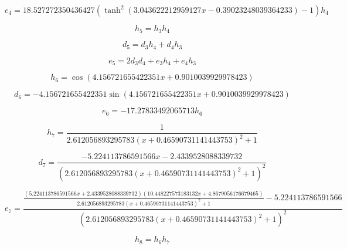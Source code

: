 \begin{equation}
e_{4}=18.527272350436427 \left(\tanh^{2}{\left(3.043622212959127 x - 0.39023248039364233 \right)} - 1\right) h_{4}
\end{equation}


\begin{equation}
h_{5}=h_{3} h_{4}
\end{equation}


\begin{equation}
d_{5}=d_{3} h_{4} + d_{4} h_{3}
\end{equation}


\begin{equation}
e_{5}=2 d_{3} d_{4} + e_{3} h_{4} + e_{4} h_{3}
\end{equation}


\begin{equation}
h_{6}=\cos{\left(4.156721655422351 x + 0.9010039929978423 \right)}
\end{equation}


\begin{equation}
d_{6}=- 4.156721655422351 \sin{\left(4.156721655422351 x + 0.9010039929978423 \right)}
\end{equation}


\begin{equation}
e_{6}=- 17.27833492065713 h_{6}
\end{equation}


\begin{equation}
h_{7}=\frac{1}{2.612056893295783 \left(x + 0.46590731141443753\right)^{2} + 1}
\end{equation}


\begin{equation}
d_{7}=\frac{- 5.224113786591566 x - 2.4339528088339732}{\left(2.612056893295783 \left(x + 0.46590731141443753\right)^{2} + 1\right)^{2}}
\end{equation}


\begin{equation}
e_{7}=\frac{\frac{\left(5.224113786591566 x + 2.4339528088339732\right) \left(10.448227573183132 x + 4.8679056176679465\right)}{2.612056893295783 \left(x + 0.46590731141443753\right)^{2} + 1} - 5.224113786591566}{\left(2.612056893295783 \left(x + 0.46590731141443753\right)^{2} + 1\right)^{2}}
\end{equation}


\begin{equation}
h_{8}=h_{6} h_{7}
\end{equation}


